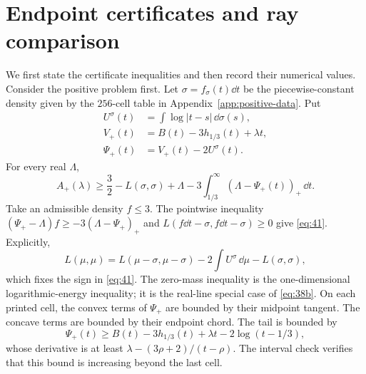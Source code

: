 \section{Endpoint certificates and ray comparison}\label{sec:endpoints}

We first state the certificate inequalities and then record their
numerical values. Consider the positive problem first. Let
$\sigma=f_\sigma(t)\dd t$ be the piecewise-constant density given by the
$256$-cell table in
Appendix~\ref{app:positive-data}. Put
\[
\begin{aligned}
 U^\sigma(t)&=\int\log|t-s|\,\dd\sigma(s),\\
 V_+(t)&=B(t)-3h_{1/3}(t)+\lambda t,\\
 \Psi_+(t)&=V_+(t)-2U^\sigma(t).
\end{aligned}
\]
For every real $\Lambda$,
\begin{equation}
 A_+(\lambda)\ge \frac32-L(\sigma,\sigma)+\Lambda
       -3\int_{1/3}^{\infty}(\Lambda-\Psi_+(t))_+\,\dd t.
                                                               \label{eq:41}
\end{equation}
Take an admissible density $f\le3$. The pointwise inequality
$(\Psi_+-\Lambda)f\ge-3(\Lambda-\Psi_+)_+$ and
$L(f\dd t-\sigma,f\dd t-\sigma)\ge0$ give \eqref{eq:41}.
Explicitly,
\[
L(\mu,\mu)=L(\mu-\sigma,\mu-\sigma)-2\int U^\sigma\,\dd\mu-L(\sigma,\sigma),
\]
which fixes the sign in \eqref{eq:41}. The zero-mass inequality is the
one-dimensional logarithmic-energy inequality; it is the real-line special
case of \eqref{eq:38b}. On each printed cell, the convex
terms of $\Psi_+$ are bounded by their midpoint tangent. The concave terms
are bounded by their endpoint chord. The tail is bounded by
\[
 \Psi_+(t)\ge B(t)-3h_{1/3}(t)+\lambda t-2\log(t-1/3),
\]
whose derivative is at least $\lambda-(3\rho+2)/(t-\rho)$. The interval
check verifies that this bound is increasing beyond the last cell.

